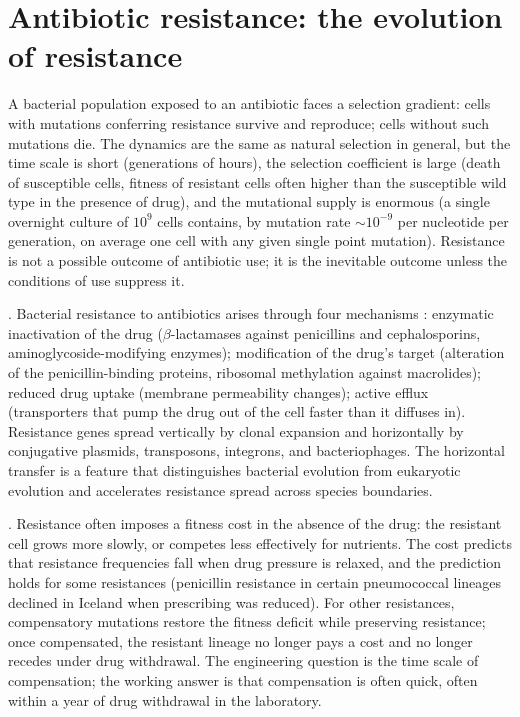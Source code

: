 \section{Antibiotic resistance: the evolution of resistance}

A bacterial population exposed to an antibiotic faces a selection
gradient: cells with mutations conferring resistance survive and
reproduce; cells without such mutations die. The dynamics are the
same as natural selection in general, but the time scale is short
(generations of hours), the selection coefficient is large (death
of susceptible cells, fitness of resistant cells often higher than
the susceptible wild type in the presence of drug), and the
mutational supply is enormous (a single overnight culture of
$10^9$ cells contains, by mutation rate $\sim 10^{-9}$ per nucleotide
per generation, on average one cell with any given single
point mutation). Resistance is not a possible outcome of antibiotic
use; it is the inevitable outcome unless the conditions of use
suppress it.

. Bacterial resistance to
antibiotics arises through four mechanisms
\cite[chs.~2--3]{text:v6c08-walsh-resistance}: enzymatic inactivation of
the drug ($\beta$-lactamases against penicillins and cephalosporins,
aminoglycoside-modifying enzymes); modification of the drug's
target (alteration of the penicillin-binding proteins, ribosomal
methylation against macrolides); reduced drug uptake (membrane
permeability changes); active efflux (transporters that pump the
drug out of the cell faster than it diffuses in). Resistance genes
spread vertically by clonal expansion and horizontally by conjugative
plasmids, transposons, integrons, and bacteriophages. The horizontal
transfer is a feature that distinguishes bacterial evolution from
eukaryotic evolution and accelerates resistance spread across
species boundaries.

. Resistance often imposes a
fitness cost in the absence of the drug: the resistant cell grows
more slowly, or competes less effectively for nutrients. The cost
predicts that resistance frequencies fall when drug pressure is
relaxed, and the prediction holds for some resistances (penicillin
resistance in certain pneumococcal lineages declined in Iceland
when prescribing was reduced). For other resistances, compensatory
mutations restore the fitness deficit while preserving resistance;
once compensated, the resistant lineage no longer pays a cost and
no longer recedes under drug withdrawal. The engineering question is
the time scale of compensation; the working answer is that
compensation is often quick, often within a year of drug withdrawal
in the laboratory.

